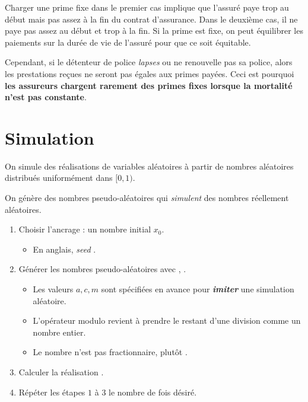 \documentclass[french]{article}
\begin{document}
\begin{multicols*}{2}
\begin{rappel_enhanced}[Contexte]
\bigskip

Charger une prime fixe dans le premier cas implique que l'assuré paye trop au début mais pas assez à la fin du contrat d'assurance. Dans le deuxième cas, il ne paye pas assez au début et trop à la fin. Si la prime est fixe, on peut équilibrer les paiements sur la durée de vie de l'assuré pour que ce soit équitable.	

\bigskip

Cependant, si le détenteur de police \og \textit{lapses} \fg{} ou ne renouvelle pas sa police, alors les prestations reçues ne seront pas égales aux primes payées. Ceci est pourquoi \textbf{les assureurs chargent rarement des primes fixes lorsque la mortalité n'est pas constante}.
\end{rappel_enhanced}





\newpage	
\section{Simulation}\label{sec:simulation}
On simule des réalisations de variables aléatoires à partir de nombres aléatoires distribués uniformément dans $[0, 1)$.

\begin{algo2}
On génère des nombres pseudo-aléatoires qui \textit{simulent} des nombres réellement aléatoires.

\begin{enumerate}[label = \circled{\arabic*}{trueblue}]
	\item	Choisir l'ancrage : un nombre initial $x_{0}$.
		\begin{itemize}
		\item	En anglais, \og \textit{seed} \fg{}.
		\end{itemize}
	\item	Générer les nombres pseudo-aléatoires avec , .
		\begin{itemize}
		\item	Les valeurs $a, c, m$ sont spécifiées en avance pour \textbf{\textit{imiter}} une simulation aléatoire.
		\item	L'opérateur modulo revient à prendre le restant d'une division comme un nombre entier.
		\item	Le nombre n'est pas fractionnaire, plutôt \lfbox[conditions]{$x_{j + 1} \in [0, m)$}.
		\end{itemize}
	\item	Calculer la réalisation .
	\item	Répéter les étapes $1$ à $3$ le nombre de fois désiré.
\end{enumerate}


\end{algo2}
\end{multicols*}
\end{document}
